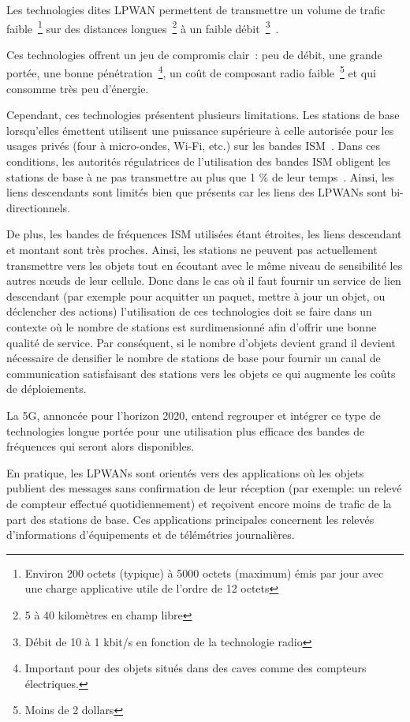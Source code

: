 Les technologies dites \ac{LPWAN} permettent de transmettre un volume de trafic faible~\footnote{Environ 200 octets (typique) à 5000 octets (maximum) émis par jour avec une charge applicative utile de l'ordre de 12 octets} sur des distances longues~\footnote{5 à 40 kilomètres en champ libre} à un faible débit~\footnote{Débit de 10 à 1 kbit/s en fonction de la technologie radio}~\cite{xiong2015low}.

Ces technologies offrent un jeu de compromis clair~: peu de débit, une grande portée, une bonne pénétration~\footnote{Important pour des objets situés dans des caves comme des compteurs électriques.}, un coût de composant radio faible~\footnote{Moins de 2 dollars} et qui consomme très peu d'énergie.

Cependant, ces technologies présentent plusieurs limitations.
Les stations de base lorsqu'elles émettent utilisent une puissance supérieure à celle autorisée pour les usages privés (four à micro-ondes, Wi-Fi, etc.) sur les bandes \ac{ISM}~\cite{rec200170}.
Dans ces conditions, les autorités régulatrices de l'utilisation des bandes \ac{ISM} obligent les stations de base à ne pas transmettre au plus que 1 \% de leur temps~\cite{vangelista2015long}.
Ainsi, les liens descendants sont limités bien que présents car les liens des \ac{LPWAN}s sont bi-directionnels.

De plus, les bandes de fréquences \ac{ISM} utilisées étant étroites, les liens descendant et montant sont très proches.
Ainsi, les stations ne peuvent pas actuellement transmettre vers les objets tout en écoutant avec le même niveau de sensibilité les autres nœuds de leur cellule.
Donc dans le cas où il faut fournir un service de lien descendant (par exemple pour acquitter un paquet, mettre à jour un objet, ou déclencher des actions) l'utilisation de ces technologies doit se faire dans un contexte où le nombre de stations est surdimensionné afin d'offrir une bonne qualité de service.
Par conséquent, si le nombre d'objets devient grand il devient nécessaire de densifier le nombre de stations de base pour fournir un canal de communication satisfaisant des stations vers les objets ce qui augmente les coûts de déploiements.

La 5G, annoncée pour l'horizon 2020, entend regrouper et intégrer ce type de technologies longue portée pour une utilisation plus efficace des bandes de fréquences qui seront alors disponibles.

En pratique, les \ac{LPWAN}s sont orientés vers des applications où les objets publient des messages sans confirmation de leur réception (par exemple: un relevé de compteur effectué quotidiennement) et reçoivent encore moins de trafic de la part des stations de base.
Ces applications principales concernent les relevés d'informations d'équipements et de télémétries journalières.

